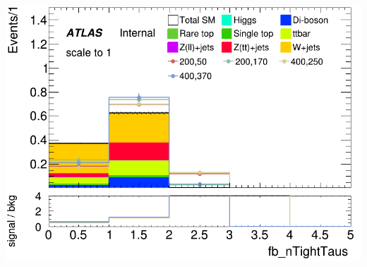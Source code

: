 \documentclass[usenames,dvipsnames]{beamer}
\begin{document}
\begin{frame}
\begin{minipage}{0.32\textwidth}
        \includegraphics[width=\textwidth]{graphics/LH_met_sig/LH_fb_nTightTaus_norm.png}
    \end{minipage}
\end{frame}
\end{document}
